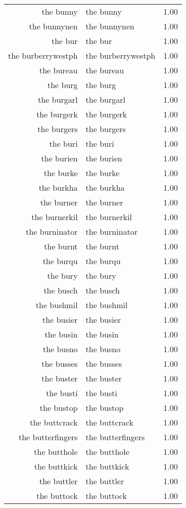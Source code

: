 \begin{table}[ht]
\begin{tabular}{rlr}
  the bunny & the bunny & 1.00 \\ 
  the bunnynen & the bunnynen & 1.00 \\ 
  the bur & the bur & 1.00 \\ 
  the burberrywestph & the burberrywestph & 1.00 \\ 
  the bureau & the bureau & 1.00 \\ 
  the burg & the burg & 1.00 \\ 
  the burgarl & the burgarl & 1.00 \\ 
  the burgerk & the burgerk & 1.00 \\ 
  the burgers & the burgers & 1.00 \\ 
  the buri & the buri & 1.00 \\ 
  the burien & the burien & 1.00 \\ 
  the burke & the burke & 1.00 \\ 
  the burkha & the burkha & 1.00 \\ 
  the burner & the burner & 1.00 \\ 
  the burnerkil & the burnerkil & 1.00 \\ 
  the burninator & the burninator & 1.00 \\ 
  the burnt & the burnt & 1.00 \\ 
  the burqu & the burqu & 1.00 \\ 
  the bury & the bury & 1.00 \\ 
  the busch & the busch & 1.00 \\ 
  the bushmil & the bushmil & 1.00 \\ 
  the busier & the busier & 1.00 \\ 
  the busin & the busin & 1.00 \\ 
  the busno & the busno & 1.00 \\ 
  the busses & the busses & 1.00 \\ 
  the buster & the buster & 1.00 \\ 
  the busti & the busti & 1.00 \\ 
  the bustop & the bustop & 1.00 \\ 
  the buttcrack & the buttcrack & 1.00 \\ 
  the butterfingers & the butterfingers & 1.00 \\ 
  the butthole & the butthole & 1.00 \\ 
  the buttkick & the buttkick & 1.00 \\ 
  the buttler & the buttler & 1.00 \\ 
  the buttock & the buttock & 1.00 \\ 

\end{tabular}
\end{table}
